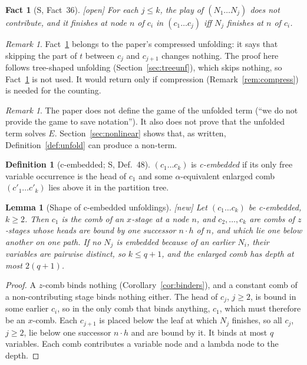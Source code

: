\documentclass[11pt]{article}
\newcommand{\suc}[2]{#1{\cdot}#2}
\newcommand{\New}{\textsf{[new]}}
\newcommand{\Open}{\textsf{\color{red!60!black}[open]}}
\theoremstyle{plain}
\newtheorem{lemma}[theorem]{Lemma}
\newtheorem{fact}[theorem]{Fact}
\theoremstyle{definition}
\newtheorem{definition}[theorem]{Definition}
\theoremstyle{remark}
\newtheorem{remark}[theorem]{Remark}
\begin{document}
\begin{fact}[S, Fact~36]\label{fact:36}
\Open{} For each $j\le k$, the play of $(N_1\dots N_j)$ does not
contribute, and it finishes at node $n$ of $c_i$ in $(c_1\dots c_j)$ iff
$N_j$ finishes at $n$ of $c_i$.
\end{fact}

\begin{remark}
Fact~\ref{fact:36} belongs to the paper's compressed unfolding: it says
that skipping the part of $t$ between $c_j$ and $c_{j+1}$ changes
nothing.  The proof here follows tree-shaped unfolding
(Section~\ref{sec:treeunf}), which skips nothing, so
Fact~\ref{fact:36} is not used.  It would return only if compression
(Remark~\ref{rem:compress}) is needed for the counting.
\end{remark}

\begin{remark}
The paper does not define the game of the unfolded term (``we do not
provide the game to save notation'').  It also does not prove that the
unfolded term solves $E$.  Section~\ref{sec:nonlinear} shows that, as
written, Definition~\ref{def:unfold} can produce a non-term.
\end{remark}

\begin{definition}[c-embedded; S, Def.~48]
$(c_1\dots c_k)$ is \emph{c-embedded} if its only free variable
occurrence is the head of $c_1$ and some $\alpha$-equivalent enlarged
comb $(c'_1\dots c'_k)$ lies above it in the partition tree.
\end{definition}

\begin{lemma}[Shape of c-embedded unfoldings]\label{lem:cembshape}
\New{} Let $(c_1\dots c_k)$ be c-embedded, $k\ge2$.  Then $c_1$ is the
comb of an $x$-stage at a node $n$, and $c_2,\dots,c_k$ are combs of
$z$-stages whose heads are bound by one successor $\suc nh$ of $n$, and
which lie one below another on one path.  If no $N_j$ is embedded
because of an earlier $N_i$, their variables are pairwise distinct, so
$k\le q+1$, and the enlarged comb has depth at most $2(q+1)$.
\end{lemma}
\begin{proof}
A $z$-comb binds nothing (Corollary~\ref{cor:binders}), and a constant
comb of a non-contributing stage binds nothing either.  The head of
$c_j$, $j\ge2$, is bound in some earlier $c_i$, so in the only comb that
binds anything, $c_1$, which must therefore be an $x$-comb.  Each $c_{j+1}$
is placed below the leaf at which $N_j$ finishes, so all $c_j$, $j\ge2$,
lie below one successor $\suc nh$ and are bound by it.  It binds at most
$q$ variables.  Each comb contributes a variable node and a lambda node
to the depth.
\end{proof}
\end{document}
